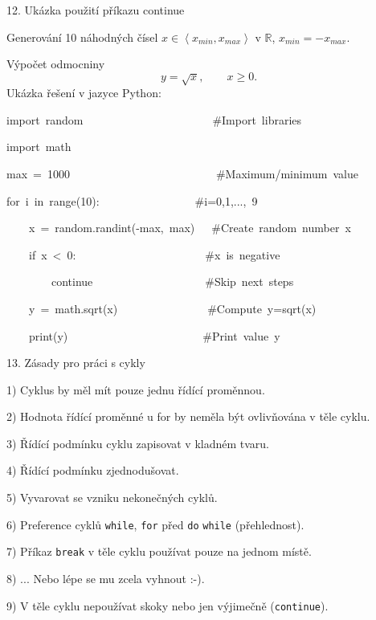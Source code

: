 \documentclass[czech]{beamer}
\newenvironment{lyxcode}
  {\par\begin{list}{}{
    \setlength{\rightmargin}{\leftmargin}
    \setlength{\listparindent}{0pt}%
    \raggedright
    \setlength{\itemsep}{0pt}
    \setlength{\parsep}{0pt}
    \normalfont\ttfamily}%
   \def\{{\char`\{}
   \def\}{\char`\}}
   \def\textasciitilde{\char`\~}
   \item[]}
  {\end{list}}
\begin{document}
\begin{frame}{12. Ukázka použití příkazu continue}

Generování 10 náhodných čísel $x\in\left\langle x_{min},x_{max}\right\rangle $
v $\mathbb{R}$, $x_{min}=-x_{max}.$

Výpočet odmocniny
\[
y=\sqrt{x},\qquad x\geq0.
\]
Ukázka řešení v jazyce Python:
\begin{lyxcode}
import~random~~~~~~~~~~~~~~~~~~~~~~~\#Import~libraries

import~math

max~=~1000~~~~~~~~~~~~~~~~~~~~~~~~~~\#Maximum/minimum~value

for~i~in~range(10):~~~~~~~~~~~~~~~~~\#i=0,1,...,~9

~~~~x~=~random.randint(-max,~max)~~~\#Create~random~number~x

~~~~if~x~<~0:~~~~~~~~~~~~~~~~~~~~~~~\#x~is~negative

~~~~~~~~continue~~~~~~~~~~~~~~~~~~~~\#Skip~next~steps

~~~~y~=~math.sqrt(x)~~~~~~~~~~~~~~~~\#Compute~y=sqrt(x)

~~~~print(y)~~~~~~~~~~~~~~~~~~~~~~~~\#Print~value~y
\end{lyxcode}
\end{frame}

\begin{frame}{13. Zásady pro práci s cykly}

1) Cyklus by měl mít pouze jednu řídící proměnnou.\bigskip{}

2) Hodnota řídící proměnné u for by neměla být ovlivňována v těle
cyklu.\bigskip{}

3) Řídící podmínku cyklu zapisovat v kladném tvaru.

\bigskip{}
4) Řídící podmínku zjednodušovat.

\bigskip{}

5) Vyvarovat se vzniku nekonečných cyklů.\bigskip{}

6) Preference cyklů \texttt{while}, \texttt{for} před \texttt{do}
\texttt{while} (přehlednost).\bigskip{}

7) Příkaz \texttt{break} v těle cyklu používat pouze na jednom místě.\bigskip{}

8) ... Nebo lépe se mu zcela vyhnout :-).\bigskip{}

9) V těle cyklu nepoužívat skoky nebo jen výjimečně (\texttt{continue}).
\end{frame}
\end{document}
